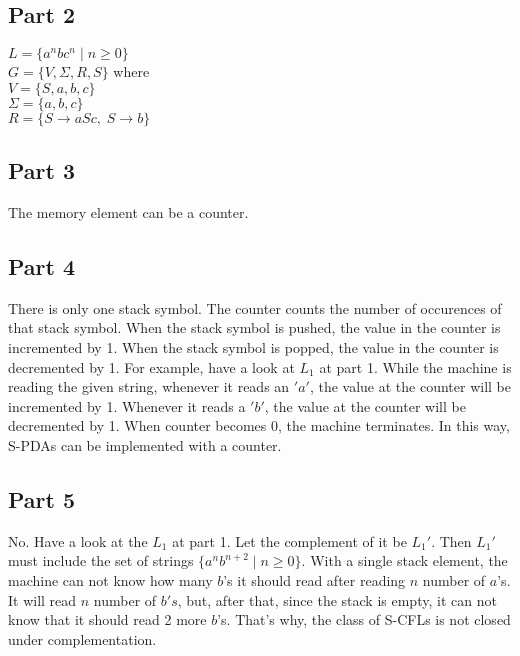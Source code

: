\documentclass{article}
\begin{document}
\subsection*{Part 2}
$L = \{a^nbc^n \;|\; n \geq 0\}$\\
$G = \{V,\Sigma, R, S\}$ where\\
$V = \{S,a,b,c\}$\\
$\Sigma = \{a,b,c\}$\\
$R = \{S \rightarrow aSc,\; S \rightarrow b\}$
\subsection*{Part 3}
The memory element can be a counter.
\subsection*{Part 4}
There is only one stack symbol. The counter counts the number of occurences of that stack symbol. When the stack symbol is pushed, the value in the counter is incremented by 1. When the stack symbol is popped, the value in the counter is decremented by 1. For example, have a look at $L_1$ at part 1. While the machine is reading the given string, whenever it reads an $'a'$, the value at the counter will be incremented by 1. Whenever it reads a $'b'$, the value at the counter will be decremented by 1. When counter becomes 0, the machine terminates. In this way, S-PDAs can be implemented with a counter.
\subsection*{Part 5}
No. Have a look at the $L_1$ at part 1. Let the complement of it be $L_1'$. Then $L_1'$ must include the set of strings $\{a^nb^{n+2} \;|\; n \geq 0\}$. With a single stack element, the machine can not know how many $b$'s it should read after reading $n$ number of $a$'s. It will read $n$ number of $b's$, but, after that, since the stack is empty, it can not know that it should read 2 more $b$'s. That's why, the class of S-CFLs is not closed under complementation.
\end{document}
